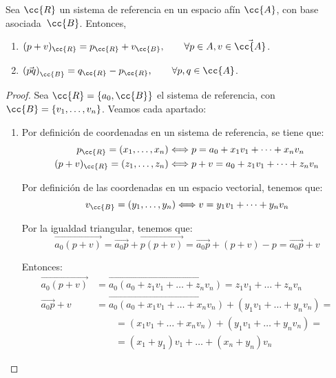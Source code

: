 \begin{prop}
    Sea $\cc{R}$ un sistema de referencia en un espacio afín $\cc{A}$, con base asociada~$\cc{B}$. Entonces,
    \begin{enumerate}
        \item $(p+v)_\cc{R}=p_{\cc{R}} + v_{\cc{B}},\qquad \forall p\in A, v\in \vec{\cc{A}}$.
        \item $\left(\vec{pq}\right)_{\cc{B}}=q_{\cc{R}}-p_{\cc{R}},\qquad \forall p,q\in \cc{A}$.
    \end{enumerate}
\end{prop}
\begin{proof}
    Sea $\cc{R}=\{a_0, \cc{B}\}$ el sistema de referencia, con $\cc{B}=\{v_1,\dots,v_n\}$. Veamos cada apartado:
    \begin{enumerate}
        \item Por definición de coordenadas en un sistema de referencia, se tiene que:
        \begin{align*}
            p_{\cc{R}}=(x_1,\dots,x_n)&\Longleftrightarrow p=a_0+x_1v_1+\dots + x_nv_n\\
            (p+v)_{\cc{R}}=(z_1,\dots,z_n) &\Longleftrightarrow p+v=a_0+z_1v_1+\dots+z_nv_n
        \end{align*}

        Por definición de las coordenadas en un espacio vectorial, tenemos que:
        \begin{equation*}
            v_{\cc{B}}=(y_1,\dots,y_n)\Longleftrightarrow v=y_1v_1+\dots+y_nv_n
        \end{equation*}

        Por la igualdad triangular, tenemos que:
        \begin{equation*}
            \vec{a_0(p+v)} = \vec{a_0p} + \vec{p(p+v)} = \vec{a_0p} + (p+v)-p = \vec{a_0p} +v
        \end{equation*}
        
        Entonces:
        \begin{equation*}\begin{split}
            \vec{a_0(p+v)} &= \vec{a_0(a_0+z_1v_1+\dots+z_nv_n)} = z_1v_1+\dots+z_nv_n \\
            \vec{a_0p}+v &= \vec{a_0(a_0+x_1v_1+\dots+x_nv_n)} + (y_1v_1+\dots+y_nv_n) =\\&\qquad=
            (x_1v_1+\dots+x_nv_n) + (y_1v_1+\dots+y_nv_n) =\\&\qquad= (x_1+y_1)v_1 + \dots + (x_n+y_n)v_n
        \end{split}\end{equation*}


\end{enumerate}
\end{proof}
